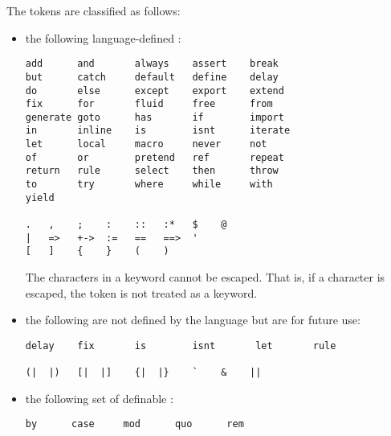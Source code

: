 The tokens are classified as follows:
\begin{itemize}
%
\item the following language-defined :
\begin{verbatim}
add      and       always    assert    break
but      catch     default   define    delay
do       else      except    export    extend
fix      for       fluid     free      from
generate goto      has       if        import
in       inline    is        isnt      iterate
let      local     macro     never     not
of       or        pretend   ref       repeat
return   rule      select    then      throw
to       try       where     while     with
yield

.   ,    ;    :    ::   :*   $    @
|   =>   +->  :=   ==   ==>  '
[   ]    {    }    (    )
\end{verbatim}
The characters in a keyword cannot be escaped.
That is, if a character is escaped, the token is not 
treated as a keyword.
%
\item the following are not defined by the language
but are  for future use:
\begin{verbatim}
delay    fix       is        isnt       let       rule

(|  |)   [|  |]    {|  |}    `    &    ||
\end{verbatim}
%
\item the following set of definable :
\begin{verbatim}
by      case     mod      quo      rem


\end{verbatim}
\end{itemize}
